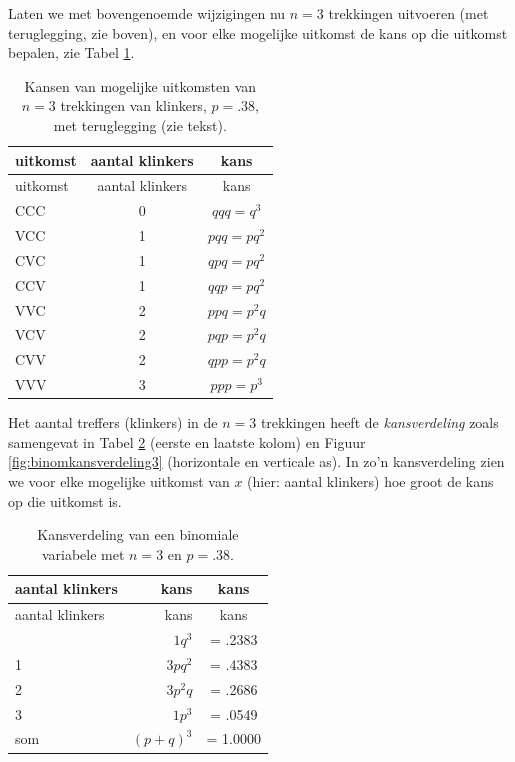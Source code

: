 \documentclass[
]{book}
\begin{document}
Laten we met bovengenoemde wijzigingen nu \(n=3\) trekkingen uitvoeren
(met teruglegging, zie boven), en voor elke mogelijke uitkomst de kans
op die uitkomst bepalen, zie
Tabel \ref{tab:klinkerkansen}.

\begin{longtable}[]{@{}lcc@{}}
\caption{\label{tab:klinkerkansen} Kansen van mogelijke uitkomsten van \(n=3\) trekkingen van klinkers,
\(p=.38\), met teruglegging (zie tekst).}\tabularnewline
\toprule\noalign{}
uitkomst & aantal klinkers & kans \\
\midrule\noalign{}
\endfirsthead
\toprule\noalign{}
uitkomst & aantal klinkers & kans \\
\midrule\noalign{}
\endhead
\bottomrule\noalign{}
\endlastfoot
CCC & 0 & \(qqq = q^3\) \\
VCC & 1 & \(pqq = pq^2\) \\
CVC & 1 & \(qpq = pq^2\) \\
CCV & 1 & \(qqp = pq^2\) \\
VVC & 2 & \(ppq = p^2q\) \\
VCV & 2 & \(pqp = p^2q\) \\
CVV & 2 & \(qpp = p^2q\) \\
VVV & 3 & \(ppp = p^3\) \\
\end{longtable}

Het aantal treffers (klinkers) in de \(n=3\) trekkingen heeft de
\emph{kansverdeling} zoals samengevat in
Tabel \ref{tab:binomkansverdeling3} (eerste en laatste kolom) en
Figuur \ref{fig:binomkansverdeling3} (horizontale en verticale as).
In zo'n kansverdeling zien we voor elke mogelijke uitkomst van \(x\) (hier:
aantal klinkers) hoe groot de kans op die uitkomst is.

\begin{longtable}[]{@{}lrc@{}}
\caption{\label{tab:binomkansverdeling3} Kansverdeling van een binomiale variabele met \(n=3\) en \(p=.38\).}\tabularnewline
\toprule\noalign{}
aantal klinkers & kans & kans \\
\midrule\noalign{}
\endfirsthead
\toprule\noalign{}
aantal klinkers & kans & kans \\
\midrule\noalign{}
\endhead
\bottomrule\noalign{}
\endlastfoot
0 & \(1 q^3\) & = .2383 \\
1 & \(3 p q^2\) & = .4383 \\
2 & \(3 p^2 q\) & = .2686 \\
3 & \(1 p^3\) & = .0549 \\
som & \((p+q)^3\) & = 1.0000 \\
\end{longtable}
\end{document}
